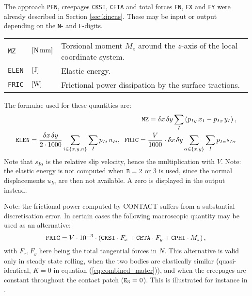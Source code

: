 \documentclass[12pt]{report}
\newenvironment{inputvars}{\vspace{0.4\baselineskip}%

\begin{tabular}{>{\raggedright}p{22mm}p{19mm}p{113mm}}}{
\end{tabular}

}
\newcommand{\inpvar}[3]{{\small\tt #1} & $#2$ & #3 \\[1ex]}
\begin{document}
The approach {\tt PEN}, creepages {\tt CKSI}, {\tt CETA} and total forces
{\tt FN}, {\tt FX} and {\tt FY} were already described in Section
\ref{sec:kincns}. These may be input or output depending on the {\tt N}-
and {\tt F}-digits.
\begin{inputvars}
\inpvar{MZ}{\bunit{N\,mm}}{Torsional moment $M_z$ around the $z$-axis of the local
        coordinate system.}
\inpvar{ELEN}{\bunit{J}}{Elastic energy.}
\inpvar{FRIC}{\bunit{W}}{Frictional power dissipation by the surface tractions.}
\end{inputvars}
The formulae used for these quantities are:
\begin{eqnarray}
  {\tt MZ} = \delta x\,\delta y
                        \sum_I \left( p_{Iy} \,x_I - p_{Ix}\, y_I\right), \\
  {\tt ELEN} = \frac{\delta x\,\delta y}{2\cdot 1000}  \sum_{i\in\{x,y,n\}}
                        \sum_{I} p_{Ii} \, u_{Ii}, \;\;
  {\tt FRIC} = \frac{V}{1000} \cdot \delta x\,\delta y
                        \sum_{\alpha\in\{x,y\}} \sum_{I} p_{I\alpha}
                        s_{I\alpha}
\end{eqnarray}
Note that $s_{I\alpha}$ is the relative slip velocity, hence the
multiplication with $V$.
Note: the elastic energy is not computed when ${\tt B}=2$ or 3 is used, since
the normal displacements $u_{In}$ are then not available. A zero is
displayed in the output instead.

Note: the frictional power computed by CONTACT suffers from a substantial
discretisation error. In certain cases the following macroscopic quantity
may be used as an alternative:
\begin{equation}
  {\tt FRIC} = V\cdot 10^{-3} \cdot \left( {\tt CKSI}\cdot F_x + 
                {\tt CETA}\cdot F_y + {\tt CPHI}\cdot M_z \right),
\end{equation}
with $F_x, F_y$ here being the total tangential forces in $\unit{N}$.
This alternative is valid only in steady state rolling, when the two
bodies are elastically similar (quasi-identical, $K=0$ in equation
(\ref{eq:combined_mater})), and when the creepages are constant throughout
the contact patch (${\tt E}_3=0$). This is illustrated for instance in
\cite{Munisamy1991}.
\end{document}
